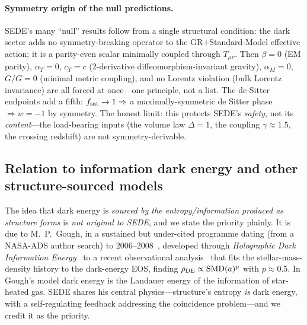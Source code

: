 \paragraph{Symmetry origin of the null predictions.} SEDE's many ``null'' results follow from a single
structural condition: the dark sector adds no symmetry-breaking operator to the GR$+$Standard-Model
effective action; it is a parity-even scalar minimally coupled through $T_{\mu\nu}$. Then $\beta=0$ (EM
parity), $\alpha_T=0$, $c_T=c$ (2-derivative diffeomorphism-invariant gravity), $\alpha_M=0$, $\dot
G/G=0$ (minimal metric coupling), and no Lorentz violation (bulk Lorentz invariance) are all forced at
once---one principle, not a list. The de Sitter endpoints add a fifth: $f_{\mathrm{sat}}\to1\Rightarrow$ a
maximally-symmetric de Sitter phase $\Rightarrow w=-1$ by symmetry. The honest limit: this protects
SEDE's \emph{safety}, not its \emph{content}---the load-bearing inputs (the volume law $\Delta=1$, the
coupling $\gamma\approx1.5$, the crossing redshift) are not symmetry-derivable.

\subsection{Relation to information dark energy and other structure-sourced models}
The idea that dark energy is \emph{sourced by the entropy/information produced as structure forms} is
\emph{not original to SEDE}, and we state the priority plainly. It is due to M.~P.~Gough, in a sustained
but under-cited programme dating (from a NASA-ADS author search) to 2006--2008~\cite{Gough2008},
developed through \emph{Holographic Dark Information Energy}~\cite{Gough:2011eq} to a recent
observational analysis~\cite{Gough2025} that fits the stellar-mass-density history to the dark-energy
EOS, finding $\rho_{\mathrm{DE}}\propto\mathrm{SMD}(a)^p$ with $p\approx0.5$. In Gough's model dark energy is the
Landauer energy of the information of star-heated gas. SEDE shares his central physics---structure's
entropy \emph{is} dark energy, with a self-regulating feedback addressing the coincidence
problem---and we credit it as the priority.

